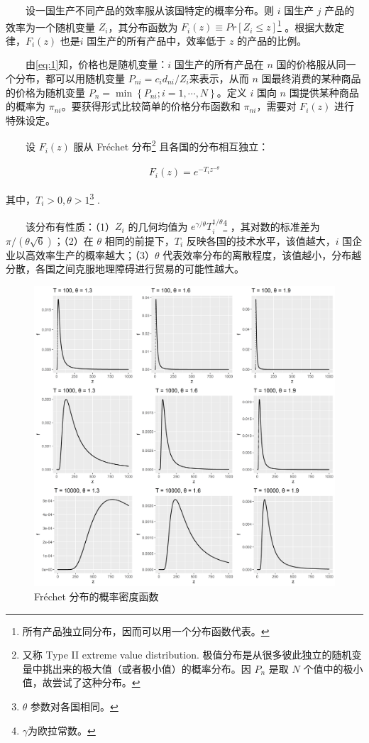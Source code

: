 \documentclass[
]{article}
\begin{document}
　　设一国生产不同产品的效率服从该国特定的概率分布。则 \(i\) 国生产 \(j\) 产品的效率为一个随机变量 \(Z_i\)，其分布函数为 \(F_i(z) \equiv Pr[Z_i \le z]\)\footnote{所有产品独立同分布，因而可以用一个分布函数代表。} 。根据大数定律，\(F_i(z)\) 也是\(i\) 国生产的所有产品中，效率低于 \(z\) 的产品的比例。

　　由\eqref{eq:1}知，价格也是随机变量：\(i\) 国生产的所有产品在 \(n\) 国的价格服从同一个分布，都可以用随机变量 \(P_{n i}=c_{i} d_{n i} / Z_{i}\)来表示，从而 \(n\) 国最终消费的某种商品的价格为随机变量 \(P_{n}=\min \left\{P_{n i} ; i=1, \cdots, N\right\}\)。定义 \(i\) 国向 \(n\) 国提供某种商品的概率为 \(\pi_{n i}\)。要获得形式比较简单的价格分布函数和 \(\pi_{n i}\)，需要对 \(F_i(z)\) 进行特殊设定。

　　设 \(F_i(z)\) 服从 Fréchet 分布\footnote{又称 Type II extreme value distribution. 极值分布是从很多彼此独立的随机变量中挑出来的极大值（或者极小值）的概率分布。因 \(P_n\) 是取 \(N\) 个值中的极小值，故尝试了这种分布。} 且各国的分布相互独立：

\begin{align}
F_{i}(z)=e^{-T_{i} z^{-\theta}} \label{eq:4}
\end{align}

其中，\(T_i>0, \theta >1\)\footnote{\(\theta\) 参数对各国相同。} .

　　该分布有性质：（1）\(Z_i\) 的几何均值为 \(e^{\gamma/\theta}T_i^{1/\theta}\)\footnote{\(\gamma\)为欧拉常数。} ，其对数的标准差为 \(\pi/(\theta \sqrt{6})\)；（2）在 \(\theta\) 相同的前提下，\(T_i\) 反映各国的技术水平，该值越大，\(i\) 国企业以高效率生产的概率越大；（3）\(\theta\) 代表效率分布的离散程度，该值越小，分布越分散，各国之间克服地理障碍进行贸易的可能性越大。

\begin{figure}
\centering
\includegraphics{Figures/Frechet.png}
\caption{Fréchet 分布的概率密度函数}
\end{figure}
\end{document}
